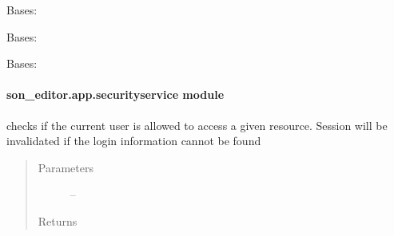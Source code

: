 \documentclass[letterpaper,10pt,english]{sphinxmanual}
\begin{document}

\begin{fulllineitems}
\label{_source/son_editor.app:son_editor.app.exceptions.PackException}
Bases: 

\end{fulllineitems}


\begin{fulllineitems}
\label{_source/son_editor.app:son_editor.app.exceptions.StillReferenced}
Bases: 

\end{fulllineitems}


\begin{fulllineitems}
\label{_source/son_editor.app:son_editor.app.exceptions.UnauthorizedException}
Bases: 

\end{fulllineitems}



\paragraph{son\_editor.app.securityservice module}
\label{_source/son_editor.app:module-son_editor.app.securityservice}\label{_source/son_editor.app:son-editor-app-securityservice-module}

\begin{fulllineitems}
\label{_source/son_editor.app:son_editor.app.securityservice.check_access}
checks if the current user is allowed to access a given resource.
Session will be invalidated if the login information cannot be found
\begin{quote}\begin{description}
\item[{Parameters}] \leavevmode
{} -- 

\item[{Returns}] \leavevmode


\end{description}\end{quote}

\end{fulllineitems}
\end{document}
